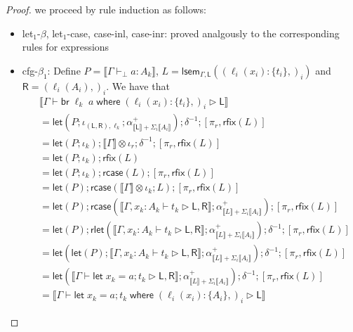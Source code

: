 \documentclass[acmsmall,screen,review]{acmart}
\newcommand{\ms}[1]{\ensuremath{\mathsf{#1}}}
\newcommand{\lto}{:}
\newcommand{\letstmt}[3]{\ensuremath{\ms{let}\;#1 = #2; #3}}
\newcommand{\brb}[2]{\ms{br}\;#1\;#2}
\newcommand{\where}[2]{#1\;\ms{where}\;#2}
\newcommand{\wbranch}[3]{#1(#2) \lto \{#3\}}
\newcommand{\bhyp}[2]{#1 : #2}
\newcommand{\hasty}[4]{#1 \vdash_{#2} #3: {#4}}
\newcommand{\haslb}[3]{#1 \vdash #2 \rhd #3}
\newcommand{\brle}[1]{{\textsf{#1}}}
\newcommand{\dnt}[1]{\llbracket{#1}\rrbracket}
\newcommand{\loopmor}[3]{\ms{lsem}_{#1, #3}(#2)}
\newcommand{\lmor}[1]{\ms{let}(#1)}
\newcommand{\rlmor}[1]{\ms{rlet}(#1)}
\newcommand{\rcase}[1]{\ms{rcase}(#1)}
\newcommand{\rfix}[1]{\ms{rfix}(#1)}
\begin{document}
\begin{proof}
  we proceed by rule induction as follows:
  \begin{itemize}[leftmargin=*]
    \item \brle{let$_1$-$\beta$}, \brle{let$_1$-case}, \brle{case-inl}, \brle{case-inr}: proved
    analgously to the corresponding rules for expressions
    \item \brle{cfg-$\beta_1$}: 
    Define $P = \dnt{\hasty{\Gamma}{\bot}{a}{A_k}}$, %
           $L = \loopmor{\Gamma}{(\wbranch{\ell_i}{x_i}{t_i},)_i}{\ms{L}}$ and %
           $\ms{R} = (\ell_i(A_i),)_i$. %
    We have that
    \begin{equation}
      \begin{aligned}
        & \dnt{\haslb{\Gamma}{\where{\brb{\ell_k}{a}}{(\wbranch{\ell_i}{x_i}{t_i},)_i}}{\ms{L}}} \\
        & = \lmor{
              P ; \iota_{(\ms{L}, \ms{R}), \ell_k} ;
              \alpha^+_{\dnt{\ms{L}} + \Sigma_i \dnt{A_i}}
          } ; \delta^{-1} ; [\pi_r, \rfix{L}] \\
        & = \lmor{P ; \iota_k} ; \dnt{\Gamma} \otimes \iota_r ; \delta^{-1} ; [\pi_r, \rfix{L}] \\
        & = \lmor{P ; \iota_k} ; \rfix{L} \\
        & = \lmor{P ; \iota_k} ; \rcase{L} ; [\pi_r, \rfix{L}] \\
        & = \lmor{P} ; \rcase{\dnt{\Gamma} \otimes \iota_k ; L} ; [\pi_r, \rfix{L}] \\
        & = \lmor{P} 
          ; \rcase{\dnt{\haslb{\Gamma, \bhyp{x_k}{A_k}}{t_k}{\ms{L}, \ms{R}}} 
                    ; \alpha^+_{\dnt{L} + \Sigma_i\dnt{A_i}}} 
          ; [\pi_r, \rfix{L}] \\
        & = \lmor{P} 
          ; \rlmor{\dnt{\haslb{\Gamma, \bhyp{x_k}{A_k}}{t_k}{\ms{L}, \ms{R}}} 
                    ; \alpha^+_{\dnt{L} + \Sigma_i\dnt{A_i}}} 
          ; \delta^{-1}
          ; [\pi_r, \rfix{L}] \\
        & = \lmor{\lmor{P}  
              ; \dnt{\haslb{\Gamma, \bhyp{x_k}{A_k}}{t_k}{\ms{L}, \ms{R}}} 
              ; \alpha^+_{\dnt{L} + \Sigma_i\dnt{A_i}}}
          ; \delta^{-1}
          ; [\pi_r, \rfix{L}] \\
        & = \lmor{
            \dnt{\haslb{\Gamma}{\letstmt{x_k}{a}{t_k}}{\ms{L}, \ms{R}}} 
            ; \alpha^+_{\dnt{L} + \Sigma_i\dnt{A_i}}}
          ; \delta^{-1}
          ; [\pi_r, \rfix{L}] \\
        & = \dnt{
          \haslb{\Gamma}{\where{\letstmt{x_k}{a}{t_k}}{(\wbranch{\ell_i}{x_i}{A_i},)_i}}{\ms{L}}
}
\end{aligned}
\end{equation}
\end{itemize}
\end{proof}
\end{document}
